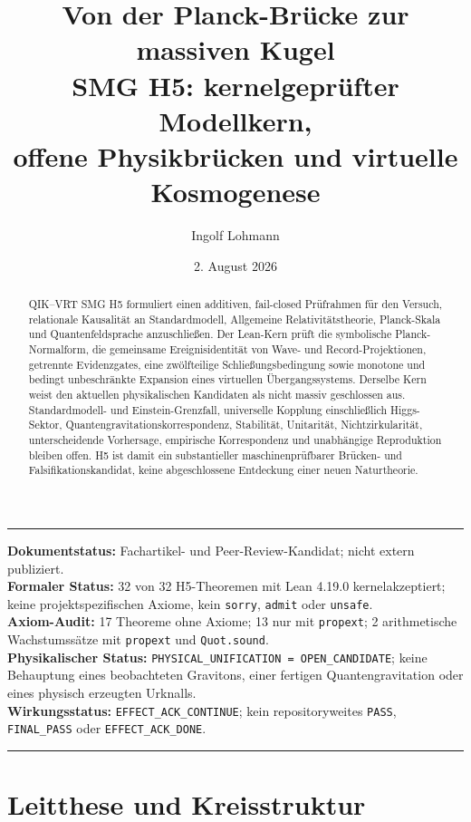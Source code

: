 \documentclass[11pt,a4paper]{article}
\title{\textbf{Von der Planck-Brücke zur massiven Kugel}\\[0.4em]
\large \QIKVRT{} SMG H5: kernelgeprüfter Modellkern,\\
\large offene Physikbrücken und virtuelle Kosmogenese}
\author{Ingolf Lohmann}
\date{2. August 2026}
\newcommand{\QIKVRT}{QIK--VRT}
\newcommand{\code}[1]{\texttt{#1}}
\newenvironment{statusbox}{%
  \begin{center}\begin{minipage}{0.94\textwidth}\small
  \color{qikdarkgray}\hrule\vspace{0.7em}
}{%
  \vspace{0.7em}\hrule\end{minipage}\end{center}
}
\begin{document}
\maketitle

\begin{statusbox}
\textbf{Dokumentstatus:} Fachartikel- und Peer-Review-Kandidat; nicht extern publiziert.\\
\textbf{Formaler Status:} 32 von 32 H5-Theoremen mit Lean 4.19.0 kernelakzeptiert;
keine projektspezifischen Axiome, kein \code{sorry}, \code{admit} oder
\code{unsafe}.\\
\textbf{Axiom-Audit:} 17 Theoreme ohne Axiome; 13 nur mit \code{propext};
2 arithmetische Wachstumssätze mit \code{propext} und \code{Quot.sound}.\\
\textbf{Physikalischer Status:} \code{PHYSICAL\_UNIFICATION = OPEN\_CANDIDATE};
keine Behauptung eines beobachteten Gravitons, einer fertigen Quantengravitation
oder eines physisch erzeugten Urknalls.\\
\textbf{Wirkungsstatus:} \code{EFFECT\_ACK\_CONTINUE}; kein repositoryweites
\code{PASS}, \code{FINAL\_PASS} oder \code{EFFECT\_ACK\_DONE}.
\end{statusbox}

\begin{abstract}
\QIKVRT{} SMG H5 formuliert einen additiven, fail-closed Prüfrahmen für den
Versuch, relationale Kausalität an Standardmodell, Allgemeine
Relativitätstheorie, Planck-Skala und Quantenfeldsprache anzuschließen. Der
Lean-Kern prüft die symbolische Planck-Normalform, die gemeinsame
Ereignisidentität von Wave- und Record-Projektionen, getrennte Evidenzgates,
eine zwölfteilige Schließungsbedingung sowie monotone und bedingt
unbeschränkte Expansion eines virtuellen Übergangssystems. Derselbe Kern weist
den aktuellen physikalischen Kandidaten als nicht massiv geschlossen aus.
Standardmodell- und Einstein-Grenzfall, universelle Kopplung einschließlich
Higgs-Sektor, Quantengravitationskorrespondenz, Stabilität, Unitarität,
Nichtzirkularität, unterscheidende Vorhersage, empirische Korrespondenz und
unabhängige Reproduktion bleiben offen. H5 ist damit ein substantieller
maschinenprüfbarer Brücken- und Falsifikationskandidat, keine abgeschlossene
Entdeckung einer neuen Naturtheorie.
\end{abstract}

\tableofcontents

\section{Leitthese und Kreisstruktur}
\end{document}
